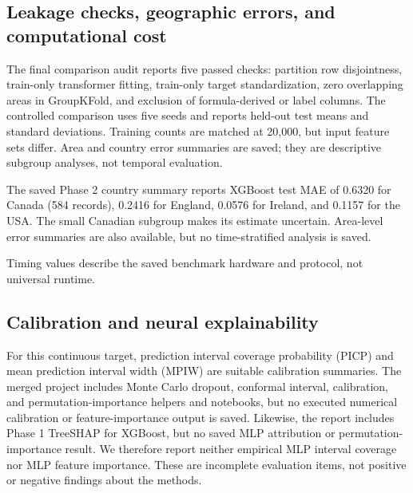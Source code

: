 \documentclass[conference]{IEEEtran}
\begin{document}
\subsection{Leakage checks, geographic errors, and computational cost}
The final comparison audit reports five passed checks: partition row disjointness, train-only transformer fitting, train-only target standardization, zero overlapping areas in GroupKFold, and exclusion of formula-derived or label columns. The controlled comparison uses five seeds and reports held-out test means and standard deviations. Training counts are matched at 20,000, but input feature sets differ. Area and country error summaries are saved; they are descriptive subgroup analyses, not temporal evaluation.

The saved Phase 2 country summary reports XGBoost test MAE of 0.6320 for Canada (584 records), 0.2416 for England, 0.0576 for Ireland, and 0.1157 for the USA. The small Canadian subgroup makes its estimate uncertain. Area-level error summaries are also available, but no time-stratified analysis is saved.

\begin{table}[!t]
\centering
\caption{Measured compute cost and model size at 20,000 training rows on an eight-core ARM system. Inference time is measured per 100,000 rows.}
\label{tab:cost}
\end{table}
\noindent Timing values describe the saved benchmark hardware and protocol, not universal runtime.

\subsection{Calibration and neural explainability}
For this continuous target, prediction interval coverage probability (PICP) and mean prediction interval width (MPIW) are suitable calibration summaries. The merged project includes Monte Carlo dropout, conformal interval, calibration, and permutation-importance helpers and notebooks, but no executed numerical calibration or feature-importance output is saved. Likewise, the report includes Phase 1 TreeSHAP for XGBoost, but no saved MLP attribution or permutation-importance result. We therefore report neither empirical MLP interval coverage nor MLP feature importance. These are incomplete evaluation items, not positive or negative findings about the methods.
\end{document}
